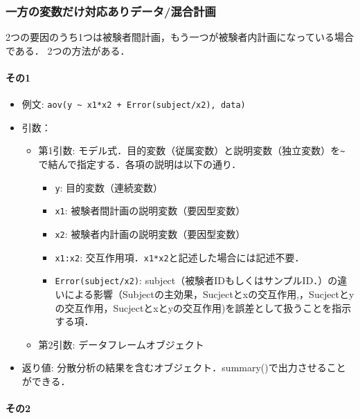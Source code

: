 \documentclass[
  xelatex, ja=standard]{bxjsarticle}
\providecommand{\tightlist}{%
  \setlength{\itemsep}{0pt}\setlength{\parskip}{0pt}}
\begin{document}
\subsubsection{一方の変数だけ対応ありデータ/混合計画}\label{ux4e00ux65b9ux306eux5909ux6570ux3060ux3051ux5bfeux5fdcux3042ux308aux30c7ux30fcux30bfux6df7ux5408ux8a08ux753b}

2つの要因のうち1つは被験者間計画，もう一つが被験者内計画になっている場合である．
2つの方法がある．

\paragraph{その1}\label{ux305dux306e1-3}

\begin{itemize}
\tightlist
\item
  例文:
  \texttt{aov(y\ \textasciitilde{}\ x1*x2\ +\ Error(subject/x2),\ data)}
\item
  引数：

  \begin{itemize}
  \tightlist
  \item
    第1引数:
    モデル式．目的変数（従属変数）と説明変数（独立変数）を\texttt{\textasciitilde{}}で結んで指定する．各項の説明は以下の通り．

    \begin{itemize}
    \tightlist
    \item
      \texttt{y}: 目的変数（連続変数）
    \item
      \texttt{x1}: 被験者間計画の説明変数（要因型変数）
    \item
      \texttt{x2}: 被験者内計画の説明変数（要因型変数）
    \item
      \texttt{x1:x2}:
      交互作用項．\texttt{x1*x2}と記述した場合には記述不要．
    \item
      \texttt{Error(subject/x2)}:
      subject（被験者IDもしくはサンプルID．）の違いによる影響（Subjectの主効果，Sucjectとxの交互作用,，Sucjectとyの交互作用，Sucjectとxとyの交互作用)を誤差として扱うことを指示する項．
    \end{itemize}
  \item
    第2引数: データフレームオブジェクト
  \end{itemize}
\item
  返り値:
  分散分析の結果を含むオブジェクト．summary()で出力させることができる．
\end{itemize}

\paragraph{その2}\label{ux305dux306e2-3}
\end{document}

